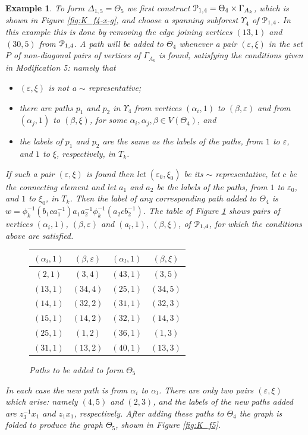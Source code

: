 \documentclass[a4paper,12pt]{article}
\renewcommand{\a}{\alpha }
\renewcommand{\b}{\beta }
\newcommand{\G}{\Gamma }
\newcommand{\D}{\Delta }
\newcommand{\e}{\varepsilon }
\newcommand{\T}{\Theta }
\newcommand{\U}{\Upsilon }
\newcommand{\cP}{{\cal{P}}}
\newtheorem{exam}[theorem]{Example}
\newenvironment{example}{\begin{exam} \rm}{\end{exam}}
\numberwithin{equation}{section}
\numberwithin{figure}{section}
\begin{document}
\begin{example}
To form $\D_{1,5}=\T_5$ we first construct $\cP_{1,4}=\T_4\times \G_{A_k}$,
which is shown in Figure \ref{fig:K_f4-x-g}, and choose a spanning
subforest $\U_4$ of $\cP_{1,4}$. In this example this is done by
removing the edge  joining vertices $(13,1)$ and $(30,5)$ from
$\cP_{1,4}$. A path will be added to $\T_4$ whenever a pair $(\e,\xi)$
in the set $P$ of non-diagonal pairs of vertices of $\G_{A_k}$ is
found, satisfying the conditions given in Modification 5: namely
that
\begin{itemize}
\item
$(\e,\xi)$ is not a $\sim$ representative;
\item  there are paths $p_1$ and $p_2$ in $\U_4$ from
vertices $(\a_i,1)$ to $(\b,\e)$ and from $(\a_j,1)$ to $(\b,\xi)$, for some $\a_i, \a_j, \b\in V(\T_4)$,
and
\item
the labels of $p_1$ and $p_2$  are the same as the labels of the paths, from $1$ to $\e$, and $1$ to $\xi$,
respectively, in $T_k$.
\end{itemize}
If  such a pair $(\e,\xi)$ is found then let $(\e_0,\xi_0)$ be its $\sim$ representative, let
$c$ be the connecting element and let $a_1$ and $a_2$ be the labels of  the paths, from
$1$ to $\e_0$, and $1$ to $\xi_0$, in $T_k$. Then the label of any corresponding  path added to
$\T_4$ is $w=\phi_k^{-1}(b_1ca_1^{-1})a_1a_2^{-1}\phi_k^{-1}(a_2cb_2^{-1})$.
The table of Figure \ref{tab:T5} shows pairs of vertices $(\a_i,1)$, $(\b,\e)$ and $(a_l,1)$, $(\b,\xi)$,
of $\cP_{1,4}$, for which the conditions above are satisfied.
\begin{figure}
\begin{center}
\renewcommand{\arraystretch}{1.5}
\begin{tabular}{|c|c||c|c|}
\hline
$(\a_i,1)$& $(\b,\e)$ & $(\a_l,1)$ & $(\b,\xi)$ \\\hline\hline
$(2,1)$ & $(3,4)$ & $(43,1)$ & $(3,5)$ \\\hline
$(13,1)$ & $(34,4)$ & $(25,1)$ & $(34,5)$ \\\hline
$(14,1)$ & $(32,2)$ & $(31,1)$ & $(32,3)$ \\\hline
$(15,1)$ & $(14,2)$ & $(32,1)$ & $(14,3)$ \\\hline
$(25,1)$ & $(1,2)$ & $(36,1)$ & $(1,3)$ \\\hline
$(31,1)$ & $(13,2)$ & $(40,1)$ & $(13,3)$ \\\hline
\end{tabular}
\renewcommand{\arraystretch}{1}
\end{center}
\caption{Paths to be added to form $\T_5$}
\label{tab:T5}
\end{figure}
In each
case the new path is from $\a_i$ to $\a_l$. There are only
 two pairs  $(\e,\xi)$ which arise: namely $(4,5)$ and $(2,3)$, and the labels of the new paths
added  are $z_3^{-1}x_1$ and $z_1x_1$, respectively. After adding these paths to $\T_4$ the graph is folded to
produce the graph $\T_5$, shown in Figure \ref{fig:K_f5}.



\end{example}
\end{document}
